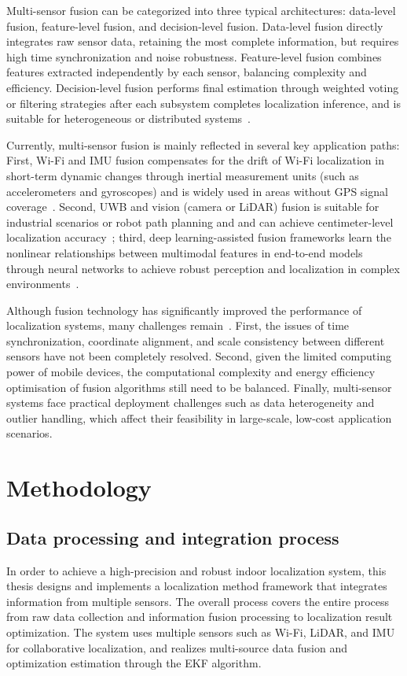 \documentclass[12pt,a4paper]{article}
\numberwithin{equation}{section}
\begin{document}
Multi-sensor fusion can be categorized into three typical architectures:
data-level fusion, feature-level fusion, and decision-level fusion. Data-level
fusion directly integrates raw sensor data, retaining the most complete
information, but requires high time synchronization and noise
robustness. Feature-level fusion combines features extracted independently by
each sensor, balancing complexity and efficiency. Decision-level fusion performs
final estimation through weighted voting or filtering strategies after each
subsystem completes localization inference, and is suitable for heterogeneous or
distributed systems~\cite{zafari2019survey}.

Currently, multi-sensor fusion is mainly reflected in several key application
paths: First, Wi-Fi and IMU fusion compensates for the drift of Wi-Fi
localization in short-term dynamic changes through inertial measurement units
(such as accelerometers and gyroscopes) and is widely used in areas without GPS
signal coverage~\cite{liu2019fusion}. Second, UWB and vision (camera or LiDAR)
fusion is suitable for industrial scenarios or robot path planning and and can
achieve centimeter-level localization accuracy~\cite{gu2020fusion}; third, deep
learning-assisted fusion frameworks learn the nonlinear relationships between
multimodal features in end-to-end models through neural networks to achieve
robust perception and localization in complex environments~\cite{zhou2022deep}.

Although fusion technology has significantly improved the performance of
localization systems, many challenges remain~\cite{zafari2019survey}. First, the
issues of time synchronization, coordinate alignment, and scale consistency
between different sensors have not been completely resolved. Second, given the
limited computing power of mobile devices, the computational complexity and
energy efficiency optimisation of fusion algorithms still need to be
balanced. Finally, multi-sensor systems face practical deployment challenges
such as data heterogeneity and outlier handling, which affect their feasibility
in large-scale, low-cost application scenarios.


\newpage
\section{Methodology}
\subsection{Data processing and integration process}
In order to achieve a high-precision and robust indoor localization system, this
thesis designs and implements a localization method framework that integrates
information from multiple sensors. The overall process covers the entire process
from raw data collection and information fusion processing to localization
result optimization. The system uses multiple sensors such as Wi-Fi, LiDAR, and
IMU for collaborative localization, and realizes multi-source data fusion and
optimization estimation through the EKF algorithm.
\end{document}
